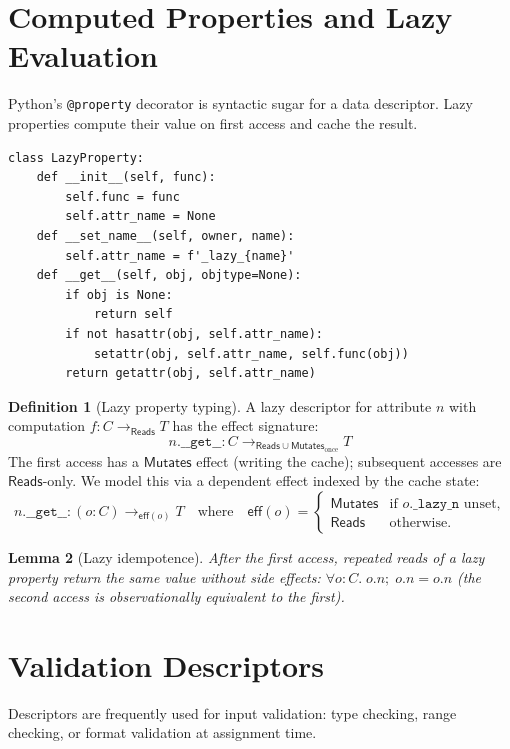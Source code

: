 \documentclass[11pt,a4paper]{report}
\theoremstyle{definition}
\newtheorem{definition}{Definition}[chapter]
\theoremstyle{plain}
\newtheorem{lemma}[definition]{Lemma}
\newcommand{\Reads}{\mathsf{Reads}}
\newcommand{\Mutates}{\mathsf{Mutates}}
\begin{document}
\section{Computed Properties and Lazy Evaluation}

Python's \texttt{@property} decorator is syntactic sugar for a data descriptor.
Lazy properties compute their value on first access and cache the result.

\begin{lstlisting}[style=python]
class LazyProperty:
    def __init__(self, func):
        self.func = func
        self.attr_name = None
    def __set_name__(self, owner, name):
        self.attr_name = f'_lazy_{name}'
    def __get__(self, obj, objtype=None):
        if obj is None:
            return self
        if not hasattr(obj, self.attr_name):
            setattr(obj, self.attr_name, self.func(obj))
        return getattr(obj, self.attr_name)
\end{lstlisting}

\begin{definition}[Lazy property typing]
A lazy descriptor for attribute $n$ with computation $f : C \to_{\Reads} T$
has the effect signature:
\[
  n.\texttt{\_\_get\_\_} : C \to_{\Reads \cup \Mutates_{\text{once}}} T
\]
The first access has a $\Mutates$ effect (writing the cache); subsequent
accesses are $\Reads$-only.  We model this via a dependent effect indexed
by the cache state:
\[
  n.\texttt{\_\_get\_\_} : (o : C) \to_{\mathsf{eff}(o)} T
  \quad\text{where}\quad
  \mathsf{eff}(o) = \begin{cases}
    \Mutates & \text{if } o.\texttt{\_lazy\_n} \text{ unset,} \\
    \Reads   & \text{otherwise.}
  \end{cases}
\]
\end{definition}

\begin{lemma}[Lazy idempotence]
After the first access, repeated reads of a lazy property return the same
value without side effects:
$\forall o : C.\; o.n ;\; o.n = o.n$
(the second access is observationally equivalent to the first).
\end{lemma}

\section{Validation Descriptors}

Descriptors are frequently used for input validation: type checking, range
checking, or format validation at assignment time.
\end{document}
